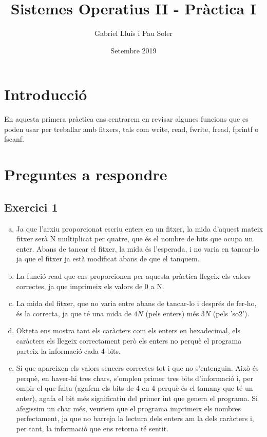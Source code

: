 \documentclass[catalan, a4, 12pt]{article}
\title{\textbf{Sistemes Operatius II - Pràctica I}}
\author{Gabriel Lluís i Pau Soler}
\date{Setembre 2019}
\begin{document}
\maketitle
{}
\thispagestyle{plain}

\section*{Introducció}
En aquesta primera pràctica ens centrarem en revisar algunes funcions que es poden usar per treballar amb fitxers, tals com write, read, fwrite, fread, fprintf o fscanf. 

\section*{Preguntes a respondre}
\subsection*{Exercici 1}

\begin{enumerate}[(a)]
    \item Ja que l'arxiu proporcionat escriu enters en un fitxer, la mida d'aquest mateix fitxer serà N multiplicat per quatre, que és el nombre de bits que ocupa un enter. Abans de tancar el fitxer, la mida és l'esperada, i no varia en tancar-lo ja que el fitxer ja està modificat abans de que el tanquem.
    
    \item La funció read que ens proporcionen per aquesta pràctica llegeix els valors correctes, ja que imprimeix els valors de 0 a N.
    
    \item La mida del fitxer, que no varia entre abans de tancar-lo i després de fer-ho, és la correcta, ja que té una mida de $4N$ (pels enters) més $3N$ (pels 'so2').
    
    \item Okteta ens mostra tant els caràcters com els enters en hexadecimal, els caràcters els llegeix correctament però els enters no perquè el programa parteix la informació cada 4 bits.
    
    \item Sí que apareixen els valors sencers correctes tot i que no s'entenguin. Això és perquè, en haver-hi tres chars, s'omplen primer tres bits d'informació i, per ompir el que falta (agafem els bits de 4 en 4 perquè és el tamany que té un enter), agafa el bit més significatiu del primer int que genera el programa. Si afegissim un char més, veuriem que el programa imprimeix els nombres perfectament, ja que no barreja la lectura dels enters am la dels caràcters i, per tant, la informació que ens retorna té sentit.
\end{enumerate}
\end{document}
